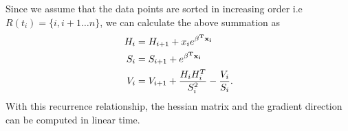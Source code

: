 Since we assume that the data points are sorted in increasing order i.e $R(t_i) = \{i, i+1 \ldots n \}$, we can calculate the above summation as 
\begin{align}
H_{i}& =   H_{i+1} +  x_{i} e^{\bold{\beta^T x_i}}\\
S_i & = S_{i+1} + e^{\bold{\beta^T x_i}} \\
V_i & = V_{i+1} +  \frac{H_{i}H_{i}^T }{ S_{i}^2 } -  \frac{V_{i}}{ S_{i}}.
\end{align}
With this recurrence relationship, the hessian matrix and the gradient direction can be computed in linear time.



